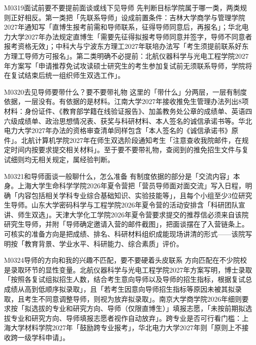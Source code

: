 \begin{qa}{M0319}{面试前要不要提前面谈或线下见导师}
先判断目标学院属于哪一类，两类规则正好相反。第一类把「先联系导师」设成前置条件：吉林大学商学与管理学院2027年通知写「直博生报考前需和导师联系，征得导师同意后，再报名」；华北电力大学2027年办法规定直博生「需要先征得拟报考导师同意并签字，导师不同意者报考资格无效」；中科大与宁波东方理工2027年联培办法写「考生须提前联系好东方理工导师方可报名」。第二类明确不必提前：北航仪器科学与光电工程学院2027年方案写「申请推荐免试攻读硕士研究生的考生参加复试前无须联系导师，学院将在复试结束后统一组织师生双选工作」。
\end{qa}

\begin{qa}{M0320}{去见导师要带什么？要不要带礼物}
这里的「带什么」分两层，一层有制度依据，一层没有。有依据的是材料。江南大学2027年接收推免生管理办法列出8项材料：身份证件、《教育部学籍在线验证报告》、加盖教务处公章的成绩单、英语四六级成绩单、政治思想情况表、获奖与科研材料、本人签名的诚信承诺书等。华北电力大学2027年办法的资格审查清单同样包含「本人签名的《诚信承诺书》原件」。北航计算机学院2027年在师生双选阶段通知考生「注意查收我院邮件，在规定时间内按要求提交相关材料」。至于要不要带礼物，查阅到的推免招生文件与复试细则均无相关规定，属经验判断。
\end{qa}

\begin{qa}{M0321}{和导师面谈一般聊什么，怎么准备}
有制度依据的部分是「交流内容」本身。上海大学生命科学学院2026年夏令营把「营员导师面对面交流」写入日程，明确「内容包括相关学科专业综合基础知识、实验技能等」，且每个小组至少3位研究生导师。山东大学密码科学与工程学院2026年夏令营的活动安排含「科研团队宣讲、师生双选」。天津大学化工学院2026年夏令营要求提交的推荐信必须来自该院研究生导师，并附「导师确定邀请入营的邮件截图」，把面谈摆在了入营链条上。可核实的准备方向是把成绩、排名、科研材料组织成能现场讲清的形式——该院写明按「教育背景、学业水平、科研能力、综合素质」评价。
\end{qa}

\begin{qa}{M0324}{导师的方向和我的兴趣不匹配，要不要硬着头皮联系}
方向匹配在不少院校是录取环节的显性变量。北航仪器科学与光电工程学院2027年方案写明，博士录取「按照各复试组拟招生人数，结合考生意向导师以及导师的招生指标，根据复试总成绩从高到低顺序拟录取」，且「若考生因意向导师招生指标等原因未被其拟录取，且考生不同意调整导师，则视为放弃拟录取」。南京大学商学院2026年细则要求按「拟选拔的专业和研究方向、导师（仅限直博生）」填报志愿，「未按前期拟选拔专业和研究方向、导师填报志愿者视作自动放弃」。跨专业是否可行看门槛：上海大学材料学院2027年「鼓励跨专业报考」，华北电力大学2027年则「原则上不接收跨一级学科申请」。
\end{qa}

